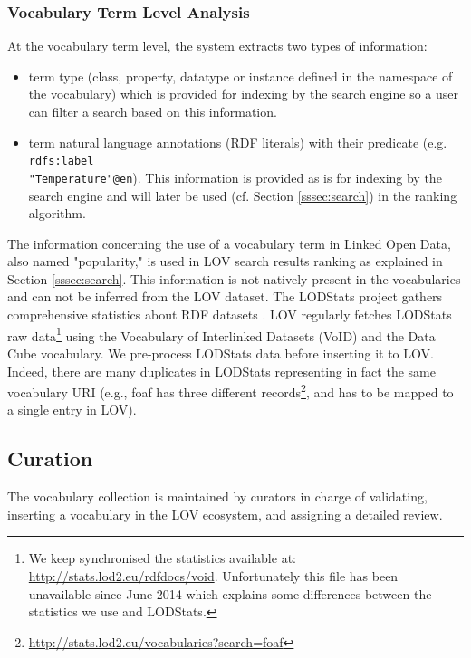 \documentclass{iosart2c}
\newcommand{\maria}[1]{\textcolor{blue}{\textbf{[MARIA:#1]}}}
\begin{document}
\subsubsection{Vocabulary Term Level Analysis}
At the vocabulary term level, the system extracts two types of information:
\begin{itemize}
\item term type (class, property, datatype or instance defined in the namespace of the vocabulary) which is provided for indexing by the search engine so a user can filter a search based on this information.
\item term natural language annotations (RDF literals) with their predicate (e.g. {\small\texttt{rdfs:label}}\\ {\small\texttt{"Temperature"@en}}). This information is provided as is for indexing by the search engine and will later be used (cf. Section \ref{sssec:search}) in the ranking algorithm.
\end{itemize}

The information concerning the use of a vocabulary term in Linked Open Data, also named "popularity," is used in LOV search results ranking as explained in Section \ref{sssec:search}. This information is not natively present in the vocabularies and can not be inferred from the LOV dataset. The LODStats project gathers comprehensive statistics about RDF datasets \cite{demter-2012-ekaw}. LOV regularly fetches LODStats raw data\footnote{We keep synchronised the statistics available at: \url{http://stats.lod2.eu/rdfdocs/void}. Unfortunately this file has been unavailable since June 2014 which explains some differences between the statistics we use and LODStats.} using the Vocabulary of Interlinked Datasets (VoID) \cite{void2009} and the Data Cube vocabulary. We pre-process LODStats data before inserting it to LOV. Indeed, there are many duplicates in LODStats representing in fact the same vocabulary URI (e.g., foaf has three different records\footnote{\url{http://stats.lod2.eu/vocabularies?search=foaf}}, and has to be mapped to a single entry in LOV).

\subsection{Curation}
The vocabulary collection is maintained by curators in charge of validating, inserting a vocabulary in the LOV ecosystem, and assigning a detailed review.

\end{document}
